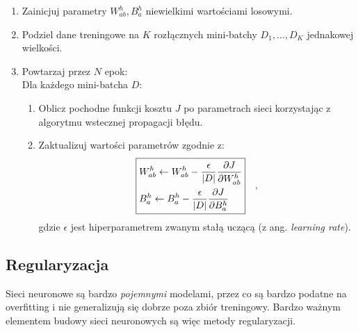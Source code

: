 \documentclass{myclass}
\begin{document}
\begin{tcolorbox}[title=Algorytm MBGD]
\begin{enumerate}
    \item Zainicjuj parametry \(W^h_{ab}, B_a^h\) niewielkimi wartościami losowymi.

    \item Podziel dane treningowe na \(K\) rozłącznych mini-batchy \(D_1, \ldots, D_K\) jednakowej
    wielkości.
    
    \item Powtarzaj przez \(N\) epok: \\
    Dla każdego mini-batcha \(D\):
    \begin{enumerate}
        \item Oblicz pochodne funkcji kosztu \(J\) po parametrach sieci korzystając z algorytmu
        wstecznej propagacji błędu.

        \item Zaktualizuj wartości parametrów zgodnie z:
        \begin{equation*}
            \boxed{
            \begin{split}
                &W^{h}_{ab} \leftarrow W^{h}_{ab} - \frac{\epsilon}{|D|}\pdv{J}{W_{ab}^h}\\
                &B_a^h \leftarrow B_a^h - \frac{\epsilon}{|D|}\pdv{J}{B_a^h}
            \end{split}}\quad,
        \end{equation*}
        gdzie \(\epsilon\) jest hiperparametrem zwanym stałą uczącą (z ang. \textit{learning rate}).
    \end{enumerate}
\end{enumerate}
\end{tcolorbox}

\subsection{Regularyzacja}

Sieci neuronowe są bardzo \textit{pojemnymi} modelami, przez co są bardzo podatne na overfitting i
nie generalizują się dobrze poza zbiór treningowy. Bardzo ważnym elementem budowy sieci neuronowych
są więc metody regularyzacji. 
\end{document}
